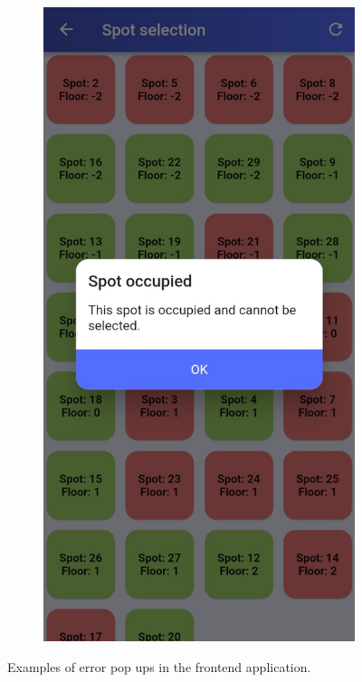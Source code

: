 \begin{figure}[htp]
\begin{subfigure}[b]{0.30\textwidth}
     \end{subfigure}
     \hfill
     \begin{subfigure}[b]{0.30\textwidth}
         \centering
         \includegraphics[width=\textwidth]{images/app/dialog2.jpg}
     \end{subfigure}
        \caption{Examples of error pop ups in the frontend application.}
        \label{fig:error-dialogs}
\end{figure}
